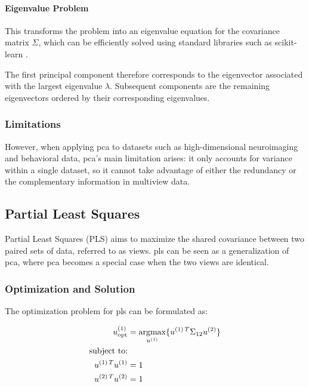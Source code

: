 \paragraph{Eigenvalue Problem}

This transforms the problem into an eigenvalue equation for the covariance matrix \(\Sigma\), which can be efficiently solved using standard libraries such as scikit-learn \citep{pedregosa2011scikit}.

The first principal component therefore corresponds to the eigenvector associated with the largest eigenvalue \(\lambda\). Subsequent components are the remaining eigenvectors ordered by their corresponding eigenvalues.

\subsubsection{Limitations}
However, when applying \acrshort{pca} to datasets such as high-dimensional neuroimaging and behavioral
data, \acrshort{pca}'s main limitation arises: it only accounts for variance within a single dataset, so it cannot take advantage of either the redundancy or the complementary information in multiview data.

\subsection{Partial Least Squares}

Partial Least Squares (PLS)\citep{wold1975path} aims to maximize the shared covariance between two paired sets of data, referred to as \gls{views}. \acrshort{pls} can be seen as a generalization of \acrshort{pca}, where \acrshort{pca} becomes a special case when the two \gls{views} are identical.

\subsubsection{Optimization and Solution}

The optimization problem for \acrshort{pls} can be formulated as:

\begin{align}
    u^{(1)}_{\text{opt}} & = \underset{u^{(1)}}{\mathrm{argmax}} \{ u^{(1)\,T} \Sigma_{12} u^{(2)} \} \\
    \text{subject to:} \notag                                                                             \\
    u^{(1)\,T}u^{(1)}   & = 1 \notag                                                                    \\
    u^{(2)\,T}u^{(2)}   & = 1 \notag
\end{align}

